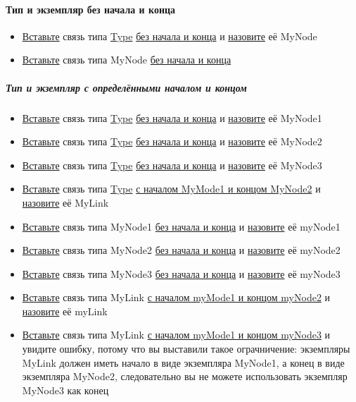 \documentclass{article}
\begin{document}
\paragraph{Тип и экземпляр без начала и конца}
\begin{itemize}
  \item \hyperlink{DeepCase.InsertLink.Def}{Вставьте} связь типа \hyperlink{type.Def}{Type} \hyperlink{FAQ.HowToInsertLinkWithoutFromAndTo}{без начала и конца} и \hyperlink{FAQ.HowToSetName}{назовите} её MyNode
  \item \hyperlink{DeepCase.InsertLink.Def}{Вставьте} связь типа MyNode \hyperlink{FAQ.HowToInsertLinkWithoutFromAndTo}{без начала и конца}
\end{itemize}
\subparagraph{Тип и экземпляр с определёнными началом и концом}
\begin{itemize}
  \item \hyperlink{DeepCase.InsertLink.Def}{Вставьте} связь типа \hyperlink{type.Def}{Type} \hyperlink{FAQ.HowToInsertLinkWithoutFromAndTo}{без начала и конца} и \hyperlink{FAQ.HowToSetName}{назовите} её MyNode1
  \item \hyperlink{DeepCase.InsertLink.Def}{Вставьте} связь типа \hyperlink{type.Def}{Type} \hyperlink{FAQ.HowToInsertLinkWithoutFromAndTo}{без начала и конца} и \hyperlink{FAQ.HowToSetName}{назовите} её MyNode2
  \item \hyperlink{DeepCase.InsertLink.Def}{Вставьте} связь типа \hyperlink{type.Def}{Type} \hyperlink{FAQ.HowToInsertLinkWithoutFromAndTo}{без начала и конца} и \hyperlink{FAQ.HowToSetName}{назовите} её MyNode3
  \item \hyperlink{DeepCase.InsertLink.Def}{Вставьте} связь типа \hyperlink{type.Def}{Type} \hyperlink{FAQ.HowToInsertLinkWithFromAndTo}{с началом MyMode1 и концом MyNode2} и \hyperlink{FAQ.HowToSetName}{назовите} её MyLink
  \item \hyperlink{DeepCase.InsertLink.Def}{Вставьте} связь типа MyNode1 \hyperlink{FAQ.HowToInsertLinkWithoutFromAndTo}{без начала и конца} и \hyperlink{FAQ.HowToSetName}{назовите} её myNode1
  \item \hyperlink{DeepCase.InsertLink.Def}{Вставьте} связь типа MyNode2 \hyperlink{FAQ.HowToInsertLinkWithoutFromAndTo}{без начала и конца} и \hyperlink{FAQ.HowToSetName}{назовите} её myNode2
  \item \hyperlink{DeepCase.InsertLink.Def}{Вставьте} связь типа MyNode3 \hyperlink{FAQ.HowToInsertLinkWithoutFromAndTo}{без начала и конца} и \hyperlink{FAQ.HowToSetName}{назовите} её myNode3
  \item \hyperlink{DeepCase.InsertLink.Def}{Вставьте} связь типа MyLink \hyperlink{FAQ.HowToInsertLinkWithFromAndTo}{с началом myMode1 и концом myNode2} и \hyperlink{FAQ.HowToSetName}{назовите} её myLink
  \item \hyperlink{DeepCase.InsertLink.Def}{Вставьте} связь типа MyLink \hyperlink{FAQ.HowToInsertLinkWithFromAndTo}{с началом myMode1 и концом myNode3} и увидите ошибку, потому что вы выставили такое ограчничение: экземпляры MyLink должен иметь начало в виде экземпляра  MyNode1, а конец в виде экземпляра MyNode2, следовательно вы не можете использовать экземпляр MyNode3 как конец
\end{itemize}
\end{document}
